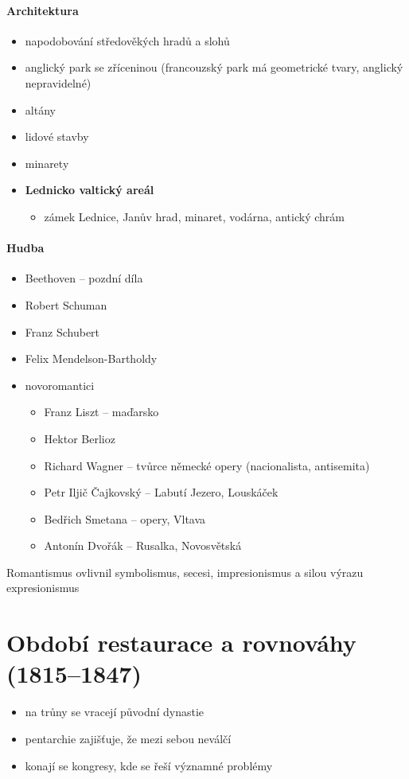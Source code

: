 \paragraph{Architektura}
\begin{itemize}
\item napodobování středověkých hradů a slohů
\item anglický park se zříceninou (francouzský park má geometrické tvary, anglický nepravidelné)
\item altány
\item lidové stavby 
\item minarety
\item \textbf{Lednicko valtický areál}
	\begin{itemize}
	\item zámek Lednice, Janův hrad, minaret, vodárna, antický chrám
	\end{itemize}
\end{itemize}

\paragraph{Hudba}
\begin{itemize}
\item Beethoven -- pozdní díla
\item Robert Schuman
\item Franz Schubert
\item Felix Mendelson-Bartholdy
\item novoromantici
	\begin{itemize}
	\item Franz Liszt -- maďarsko
	\item Hektor Berlioz
	\item Richard Wagner -- tvůrce německé opery (nacionalista, antisemita)
	\item Petr Iljič Čajkovský -- Labutí Jezero, Louskáček
	\item Bedřich Smetana -- opery, Vltava
	\item Antonín Dvořák -- Rusalka, Novosvětská
	\end{itemize}
\end{itemize}

Romantismus ovlivnil symbolismus, secesi, impresionismus a silou výrazu expresionismus



\newpage
\section{Období restaurace a rovnováhy (1815--1847)}
\begin{itemize}
\item na trůny se vracejí původní dynastie
\item pentarchie zajišťuje, že mezi sebou neválčí
\item konají se kongresy, kde se řeší významné problémy
\end{itemize}

